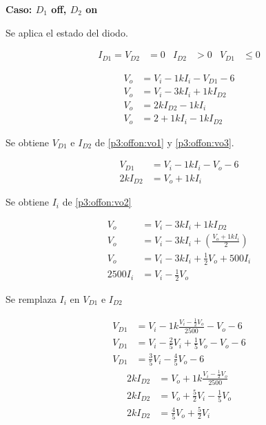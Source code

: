 %
%
%

\bigskip

\textbf{Caso: $D_1$ off, $D_2$ on}

Se aplica el estado del diodo.

\begin{align*}
  I_{D1} = V_{D2} &= 0
  &
  I_{D2} &> 0
  &
  V_{D1} &\leq 0
\end{align*}

\begin{align}
  V_o &= V_i - 1k I_i - V_{D1} - 6 \label{p3:offon:vo1}
  \\
  V_o &= V_i - 3k I_i + 1k I_{D2} \label{p3:offon:vo2}
  \\
  V_o &= 2k I_{D2} - 1k I_i \label{p3:offon:vo3}
  \\
  V_o &= 2 + 1k I_i - 1k I_{D2} \label{p3:offon:vo4}
\end{align}

Se obtiene $V_{D1}$ e $I_{D2}$ de \ref{p3:offon:vo1} y \ref{p3:offon:vo3}.

\begin{align*}
  V_{D1} &= V_i - 1k I_i - V_o - 6
  \\
  2k I_{D2} &= V_o + 1k I_i
\end{align*}

Se obtiene $I_i$ de \ref{p3:offon:vo2}

\begin{align*}
  V_o &= V_i - 3k I_i + 1k I_{D2}
  \\
  V_o &= V_i - 3k I_i + \left(\frac{V_o + 1k I_i}{2}\right)
  \\
  V_o &= V_i - 3k I_i + \frac{1}{2} V_o + 500 I_i
  \\
  2500 I_i &= V_i - \frac{1}{2} V_o
\end{align*}

Se remplaza $I_i$ en $V_{D1}$ e $I_{D2}$

\begin{align*}
  V_{D1} &= V_i - 1k \frac{V_i-\frac{1}{2} V_o}{2500} - V_o - 6
  \\
  V_{D1} &= V_i - \frac{2}{5} V_i + \frac{1}{5} V_o - V_o - 6
  \\
  V_{D1} &= \frac{3}{5} V_i - \frac{4}{5} V_o - 6
\end{align*}
\begin{align*}
  2k I_{D2} &= V_o + 1k \frac{V_i-\frac{1}{2} V_o}{2500}
  \\
  2k I_{D2} &= V_o + \frac{5}{2} V_i - \frac{1}{5} V_o
  \\
  2k I_{D2} &= \frac{4}{5} V_o + \frac{5}{2} V_i
\end{align*}

